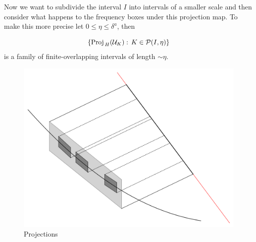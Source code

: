 Now we want to subdivide the interval $I$ into intervals of a smaller scale and then consider what happens to the frequency boxes under this projection map. To make this more precise let $0\leq \eta \leq \delta^ a$, then 

\begin{equation}\label{eq:sub projections}
\{\text{Proj}_{\,H}(\mathcal{U}_{K}):\, K\in \mathcal{P}(I,\eta)\}
\end{equation}
is a family of finite-overlapping intervals of length $\sim \eta$.
\begin{figure}[h!]
    \centering
    \includegraphics[scale=0.6]{Pics/Proj2.png}
    \caption{Projections}
    \label{fig:projections_overlap}
\end{figure}


